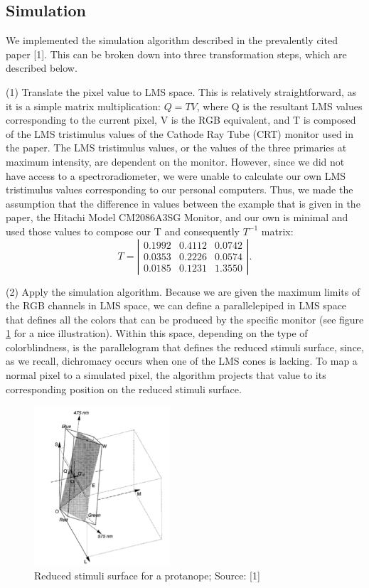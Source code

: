 \documentclass[10pt,twocolumn,letterpaper]{article}
\begin{document}
\subsection{Simulation}

We implemented the simulation algorithm described in the prevalently cited paper [1]. This can be broken down into three transformation steps, which are described below.

(1) Translate the pixel value to LMS space. This is relatively straightforward, as it is a simple matrix multiplication: $Q = TV$, where Q is the resultant LMS values corresponding to the current pixel, V is the RGB equivalent, and T is composed of the LMS tristimulus values of the Cathode Ray Tube (CRT) monitor used in the paper. The LMS tristimulus values, or the values of the three primaries at maximum intensity, are dependent on the monitor. However, since we did not have access to a spectroradiometer, we were unable to calculate our own LMS tristimulus values corresponding to our personal computers. Thus, we made the assumption that the difference in values between the example that is given in the paper, the Hitachi Model CM2086A3SG Monitor, and our own is minimal and used those values to compose our T and consequently $T^{-1}$ matrix: 
\[ T = \left| \begin{array}{ccc}
0.1992 & 0.4112 & 0.0742 \\
0.0353 & 0.2226 & 0.0574 \\
0.0185 & 0.1231 & 1.3550 \end{array} \right|.\]

(2) 	Apply the simulation algorithm. Because we are given the maximum limits of the RGB channels in LMS space, we can define a parallelepiped in LMS space that defines all the colors that can be produced by the specific monitor (see figure \ref{fig:para} for a nice illustration).  Within this space, depending on the type of colorblindness, is the parallelogram that defines the reduced stimuli surface, since, as we recall, dichromacy occurs when one of the LMS cones is lacking. To map a normal pixel to a simulated pixel, the algorithm projects that value to its corresponding position on the reduced stimuli surface. 

\begin{figure}[h]
  \includegraphics[width=0.45\textwidth]{para.png}
  \caption{Reduced stimuli surface for a protanope; Source: [1]}
  \label{fig:para}
\end{figure}
\end{document}
